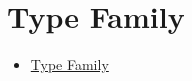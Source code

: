 \chapter{Type Family}

\begin{itemize}
    \item \href{https://wiki.haskell.org/GHC/Type_familiesl}{Type Family}
\end{itemize}
